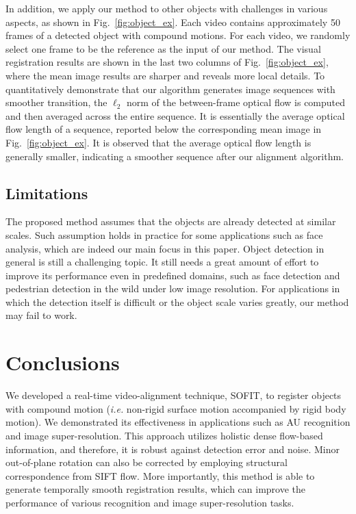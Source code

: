 \documentclass[10pt,journal]{IEEEtran}
\begin{document}
In addition, we apply our method to other objects with challenges in various aspects, as shown in Fig.~\ref{fig:object_ex}. Each video contains approximately 50 frames of a detected object with compound motions. For each video, we randomly select one frame to be the reference as the input of our method. The visual registration results are shown in the last two columns of Fig.~\ref{fig:object_ex}, where the mean image results are sharper and reveals more local details. To quantitatively demonstrate that our algorithm generates image sequences with smoother transition, the $\ell_2$ norm of the between-frame optical flow is computed and then averaged across the entire sequence. It is essentially the average optical flow length of a sequence, reported below the corresponding mean image in Fig.~\ref{fig:object_ex}. It is observed that the average optical flow length is generally smaller, indicating a smoother sequence after our alignment algorithm.

\subsection{Limitations}
The proposed method assumes that the objects are already detected at similar scales. Such assumption holds in practice for some applications such as face analysis, which are indeed our main focus in this paper. Object detection in general is still a challenging topic. It still needs a great amount of effort to improve its performance even in predefined domains, such as face detection and pedestrian detection in the wild under low image resolution. For applications in which the detection itself is difficult or the object scale varies greatly, our method may fail to work.


\section{Conclusions\label{sec:conclusion}}

We developed a real-time video-alignment technique, SOFIT, to register objects with compound motion (\textit{i.e.} non-rigid surface motion accompanied by rigid body motion). We demonstrated its effectiveness in applications such as AU recognition and image super-resolution. This approach utilizes holistic dense flow-based information, and therefore, it is robust against detection error and noise. Minor out-of-plane rotation can also be corrected by employing structural correspondence from SIFT flow. More importantly, this method is able to generate temporally smooth registration results, which can improve the performance of various recognition and image super-resolution tasks.
\end{document}
